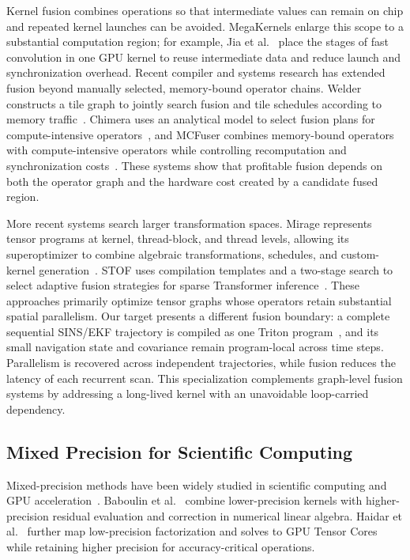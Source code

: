 Kernel fusion combines operations so that intermediate values can remain on chip and repeated kernel launches can be avoided. MegaKernels enlarge this scope to a substantial computation region; for example, Jia et al.~\cite{jia2020megakernels} place the stages of fast convolution in one GPU kernel to reuse intermediate data and reduce launch and synchronization overhead. Recent compiler and systems research has extended fusion beyond manually selected, memory-bound operator chains. Welder constructs a tile graph to jointly search fusion and tile schedules according to memory traffic~\cite{shi2023welder}. Chimera uses an analytical model to select fusion plans for compute-intensive operators~\cite{zheng2023chimera}, and MCFuser combines memory-bound operators with compute-intensive operators while controlling recomputation and synchronization costs~\cite{zhang2024mcfuser}. These systems show that profitable fusion depends on both the operator graph and the hardware cost created by a candidate fused region.

More recent systems search larger transformation spaces. Mirage represents tensor programs at kernel, thread-block, and thread levels, allowing its superoptimizer to combine algebraic transformations, schedules, and custom-kernel generation~\cite{wu2025mirage}. STOF uses compilation templates and a two-stage search to select adaptive fusion strategies for sparse Transformer inference~\cite{dai2026stof}. These approaches primarily optimize tensor graphs whose operators retain substantial spatial parallelism. Our target presents a different fusion boundary: a complete sequential SINS/EKF trajectory is compiled as one Triton program~\cite{triton}, and its small navigation state and covariance remain program-local across time steps. Parallelism is recovered across independent trajectories, while fusion reduces the latency of each recurrent scan. This specialization complements graph-level fusion systems by addressing a long-lived kernel with an unavoidable loop-carried dependency.

\subsection{Mixed Precision for Scientific Computing}
\label{subsec:related-precision}

Mixed-precision methods have been widely studied in scientific computing and GPU acceleration~\cite{abdelfattah2021survey}. Baboulin et al.~\cite{mixed-precision} combine lower-precision kernels with higher-precision residual evaluation and correction in numerical linear algebra. Haidar et al.~\cite{haidar2018tensorcores} further map low-precision factorization and solves to GPU Tensor Cores while retaining higher precision for accuracy-critical operations.

